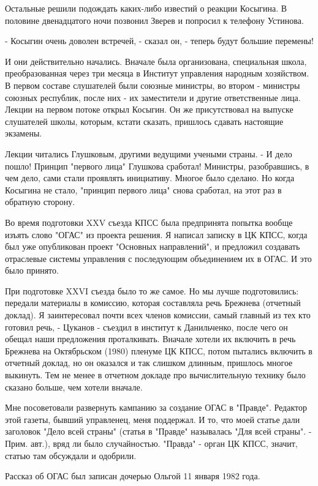 \documentclass{article}
\begin{document}
Остальные решили подождать каких-либо известий о реакции Косыгина. В половине
двенадцатого ночи позвонил Зверев и попросил к телефону Устинова.

- Косыгин очень доволен встречей, - сказал он, - теперь будут большие перемены!

И они действительно начались. Вначале была организована, специальная школа,
преобразованная через три месяца в Институт управления народным хозяйством. В
первом составе слушателей были союзные министры, во втором - министры союзных
республик, после них - их заместители и другие ответственные лица. Лекции на
первом потоке открыл Косыгин. Он же присутствовал на выпуске слушателей школы,
которым, кстати сказать, пришлось сдавать настоящие экзамены.

Лекции читались Глушковым, другими ведущими учеными страны. - И дело пошло!
Принцип "первого лица" Глушкова сработал! Министры, разобравшись, в чем дело,
сами стали проявлять инициативу. Многое было сделано. Но когда Косыгина не
стало, "принцип первого лица" снова сработал, на этот раз в обратную сторону.

Во время подготовки XXV съезда КПСС была предпринята попытка вообще изъять слово
"ОГАС" из проекта решения. Я написал записку в ЦК КПСС, когда был уже
опубликован проект "Основных направлений", и предложил создавать отраслевые
системы управления с последующим объединением их в ОГАС. И это было принято.

При подготовке XXVI съезда было то же самое. Но мы лучше подготовились:
передали материалы в комиссию, которая составляла речь Брежнева (отчетный
доклад). Я заинтересовал почти всех членов комиссии, самый главный из тех кто
готовил речь, - Цуканов - съездил в институт к Данильченко, после чего он обещал
наши предложения проталкивать. Вначале хотели их включить в речь Брежнева на
Октябрьском (1980) пленуме ЦК КПСС, потом пытались включить в отчетный доклад,
но он оказался и так слишком длинным, пришлось многое выкинуть. Тем не менее в
отчетном докладе про вычислительную технику было сказано больше, чем хотели
вначале.

Мне посоветовали развернуть кампанию за создание ОГАС в "Правде". Редактор этой
газеты, бывший управленец, меня поддержал. И то, что моей статье дали заголовок
"Дело всей страны" (статья в "Правде" называлась "Для всей страны". - Прим.
авт.), вряд ли было случайностью. "Правда" - орган ЦК КПСС, значит, статью там
обсуждали и одобрили.

Рассказ об ОГАС был записан дочерью Ольгой 11 января 1982 года.
\end{document}

